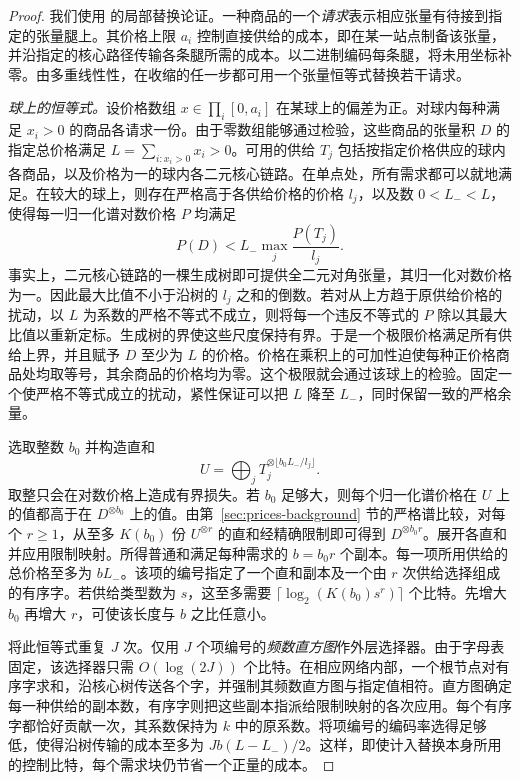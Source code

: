 \begin{proof} 我们使用 \cite[Section~]{oaG} 的局部替换论证。一种商品的一个\emph{请求}表示相应张量有待接到指定的张量腿上。其价格上限 $a_i$ 控制直接供给的成本，即在某一站点制备该张量，并沿指定的核心路径传输各条腿所需的成本。以二进制编码每条腿，将未用坐标补零。由多重线性性，在收缩的任一步都可用一个张量恒等式替换若干请求。

\smallskip\noindent \emph{球上的恒等式。}设价格数组 $x\in\prod_i[0,a_i]$ 在某球上的偏差为正。对球内每种满足 $x_i>0$ 的商品各请求一份。由于零数组能够通过检验，这些商品的张量积 $D$ 的指定总价格满足 $L=\sum_{i:x_i>0}x_i>0$。可用的供给 $T_j$ 包括按指定价格供应的球内各商品，以及价格为一的球内各二元核心链路。在单点处，所有需求都可以就地满足。在较大的球上，则存在严格高于各供给价格的价格 $l_j$，以及数 $0<L_-<L$，使得每一归一化谱对数价格 $P$ 均满足 \[
                 P(D)<L_-\max_j\frac{P(T_j)}{l_j}.
\] 事实上，二元核心链路的一棵生成树即可提供全二元对角张量，其归一化对数价格为一。因此最大比值不小于沿树的 $l_j$ 之和的倒数。若对从上方趋于原供给价格的扰动，以 $L$ 为系数的严格不等式不成立，则将每一个违反不等式的 $P$ 除以其最大比值以重新定标。生成树的界使这些尺度保持有界。于是一个极限价格满足所有供给上界，并且赋予 $D$ 至少为 $L$ 的价格。价格在乘积上的可加性迫使每种正价格商品处均取等号，其余商品的价格均为零。这个极限就会通过该球上的检验。固定一个使严格不等式成立的扰动，紧性保证可以把 $L$ 降至 $L_-$，同时保留一致的严格余量。

选取整数 $b_0$ 并构造直和 \[
               U=\bigoplus_j T_j^{\otimes\lfloor b_0L_-/l_j\rfloor}.
\] 取整只会在对数价格上造成有界损失。若 $b_0$ 足够大，则每个归一化谱价格在 $U$ 上的值都高于在 $D^{\otimes b_0}$ 上的值。由第~\ref{sec:prices-background} 节的严格谱比较，对每个 $r\ge1$，从至多 $K(b_0)$ 份 $U^{\otimes r}$ 的直和经精确限制即可得到 $D^{\otimes b_0r}$。展开各直和并应用限制映射。所得普通和满足每种需求的 $b=b_0r$ 个副本。每一项所用供给的总价格至多为 $bL_-$。该项的编号指定了一个直和副本及一个由 $r$ 次供给选择组成的有序字。若供给类型数为 $s$，这至多需要 $\lceil\log_2(K(b_0)s^r)\rceil$ 个比特。先增大 $b_0$ 再增大 $r$，可使该长度与 $b$ 之比任意小。

将此恒等式重复 $J$ 次。仅用 $J$ 个项编号的\emph{频数直方图}作外层选择器。由于字母表固定，该选择器只需 $O(\log(2J))$ 个比特。在相应网络内部，一个根节点对有序字求和，沿核心树传送各个字，并强制其频数直方图与指定值相符。直方图确定每一种供给的副本数，有序字则把这些副本指派给限制映射的各次应用。每个有序字都恰好贡献一次，其系数保持为 $k$ 中的原系数。将项编号的编码率选得足够低，使得沿树传输的成本至多为 $Jb(L-L_-)/2$。这样，即使计入替换本身所用的控制比特，每个需求块仍节省一个正量的成本。


\end{proof}
